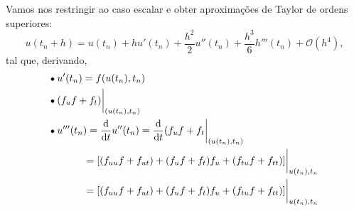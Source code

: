 \documentclass[../differential_methods.tex]{subfiles}
\begin{document}
Vamos nos restringir ao caso escalar e obter aproximações de Taylor de ordens superiores:
\[
	u(t_{n}+h) = u(t_{n}) + h u'(t_{n}) + \frac{h^{2}}{2}u''(t_{n}) + \frac{h^{3}}{6}h'''(t_{n}) + \mathcal{O}(h^{4}),
\]
tal que, derivando,
\begin{align*}
	 & \tikz[baseline=-0.5ex]\draw[black, fill=black, radius=1.5pt](0, 0)circle;\; u'(t_{n}) = f(u(t_{n}), t_{n})                                                                                                              \\
	 & \tikz[baseline=-0.5ex]\draw[black, fill=black, radius=1.5pt](0, 0)circle;\; (f_{u}f + f_{t})\biggl|_{(u(t_{n}), t_{n})}^{}\biggr.                                                                                       \\
	 & \tikz[baseline=-0.5ex]\draw[black, fill=black, radius=1.5pt](0, 0)circle;\; u'''(t_{n}) = \frac{\mathrm{d}}{\mathrm{d}t}u''(t_{n}) = \frac{\mathrm{d}}{\mathrm{d}t}(f_{u}f + f_{t}\biggl|_{(u(t_{n}), t_{n})}^{}\biggr. \\
	 & \quad\; \quad \quad = [(f_{uu}f + f_{ut}) + (f_u f + f_{t})f_u + (f_{tu}f + f_{tt})]\biggl|_{u(t_{n}), t_{n}}^{}\biggr.                                                                                                 \\
	 & \quad\; \quad \quad = [(f_{uu}f + f_{ut}) + (f_u f + f_{t})f_u + (f_{tu}f + f_{tt})]\biggl|_{u(t_{n}), t_{n}}^{}\biggr.                                                                                                 \\
\end{align*}
\end{document}
